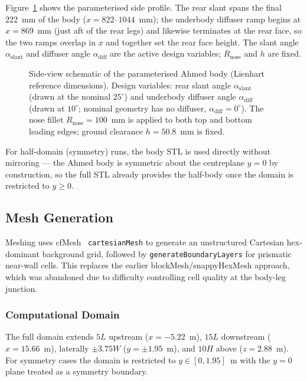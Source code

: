 Figure~\ref{fig:ahmed_schematic} shows the parameterised side profile. The rear slant spans the final 222~mm of the body ($x=822$--$1044$~mm); the underbody diffuser ramp begins at $x=869$~mm (just aft of the rear legs) and likewise terminates at the rear face, so the two ramps overlap in $x$ and together set the rear face height. The slant angle $\alpha_\mathrm{slant}$ and diffuser angle $\alpha_\mathrm{diff}$ are the active design variables; $R_\mathrm{nose}$ and $h$ are fixed.

\begin{figure}[h]
\centering
\resizebox{0.95\textwidth}{!}{}
\caption{Side-view schematic of the parameterised Ahmed body (Lienhart reference dimensions). Design variables: rear slant angle $\alpha_\mathrm{slant}$ (drawn at the nominal $25^\circ$) and underbody diffuser angle $\alpha_\mathrm{diff}$ (drawn at $10^\circ$; nominal geometry has no diffuser, $\alpha_\mathrm{diff}=0^\circ$). The nose fillet $R_\mathrm{nose}=100$~mm is applied to both top and bottom leading edges; ground clearance $h=50.8$~mm is fixed.}
\label{fig:ahmed_schematic}
\end{figure}

For half-domain (symmetry) runs, the body STL is used directly without mirroring — the Ahmed body is symmetric about the centreplane $y=0$ by construction, so the full STL already provides the half-body once the domain is restricted to $y \geq 0$.

\subsection{Mesh Generation}
\label{sec:mesh}

Meshing uses cfMesh~\cite{cfmesh} \texttt{cartesianMesh} to generate an unstructured Cartesian hex-dominant background grid, followed by \texttt{generateBoundaryLayers} for prismatic near-wall cells. This replaces the earlier blockMesh/snappyHexMesh approach, which was abandoned due to difficulty controlling cell quality at the body-leg junction.

\subsubsection{Computational Domain}

The full domain extends $5L$ upstream ($x=-5.22$~m), $15L$ downstream ($x=15.66$~m), laterally $\pm 3.75W$ ($y=\pm 1.95$~m), and $10H$ above ($z=2.88$~m). For symmetry cases the domain is restricted to $y \in [0, 1.95]$~m with the $y=0$ plane treated as a symmetry boundary.


